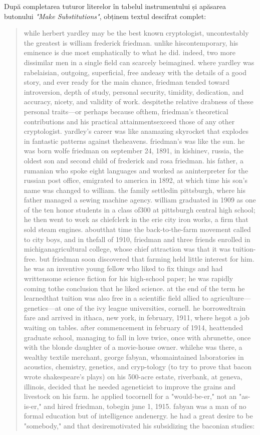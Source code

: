 \documentclass{labreport}
\begin{document}
După completarea tuturor literelor în tabelul instrumentului și apăsarea butonului \textit{"Make Substitutions"}, obținem textul descifrat complet:

\begin{quote}\footnotesize\ttfamily\raggedright
while herbert yardley may be the best known cryptologist, uncontestably the greatest is william frederick friedman. unlike hiscontemporary, his eminence is due most emphatically to what he did. indeed, two more dissimilar men in a single field can scarcely beimagined. where yardley was rabelaisian, outgoing, superficial, free andeasy with the details of a good story, and ever ready for the main chance, friedman tended toward introversion, depth of study, personal security, timidity, dedication, and accuracy, nicety, and validity of work. despitethe relative drabness of these personal traits---or perhaps because ofthem, friedman's theoretical contributions and his practical attainmentsexceed those of any other cryptologist. yardley's career was like anamazing skyrocket that explodes in fantastic patterns against theheavens. friedman's was like the sun. he was born wolfe friedman on september 24, 1891, in kishinev, russia, the oldest son and second child of frederick and rosa friedman. his father, a rumanian who spoke eight languages and worked as aninterpreter for the russian post office, emigrated to america in 1892, at which time his son's name was changed to william. the family settledin pittsburgh, where his father managed a sewing machine agency. william graduated in 1909 as one of the ten honor students in a class of300 at pittsburgh central high school; he then went to work as chiefclerk in the erie city iron works, a firm that sold steam engines. aboutthat time the back-to-the-farm movement called to city boys, and in thefall of 1910, friedman and three friends enrolled in michiganagricultural college, whose chief attraction was that it was tuition-free. but friedman soon discovered that farming held little interest for him. he was an inventive young fellow who liked to fix things and had writtensome science fiction for his high-school paper; he was rapidly coming tothe conclusion that he liked science. at the end of the term he learnedthat tuition was also free in a scientific field allied to agriculture---genetics---at one of the ivy league universities, cornell. he borrowedtrain fare and arrived in ithaca, new york, in february, 1911, where hegot a job waiting on tables. after commencement in february of 1914, heattended graduate school, managing to fall in love twice, once with abrunette, once with the blonde daughter of a movie-house owner. whilehe was there, a wealthy textile merchant, george fabyan, whomaintained laboratories in acoustics, chemistry, genetics, and cryp-tology (to try to prove that bacon wrote shakespeare's plays) on his 500-acre estate, riverbank, at geneva, illinois, decided that he needed ageneticist to improve the grains and livestock on his farm. he applied tocornell for a "would-be-er," not an "as-is-er," and hired friedman, tobegin june 1, 1915. fabyan was a man of no formal education but of intelligence andenergy. he had a great desire to be "somebody," and that desiremotivated his subsidizing the baconian studies: 
\end{quote}
\end{document}
